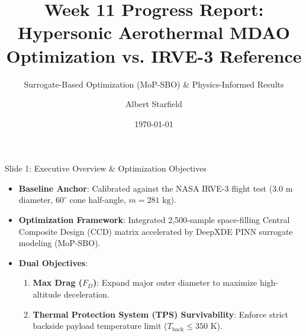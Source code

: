 \documentclass[aspectratio=169,10pt]{beamer}
\title[Week 11 Hypersonic MDAO]{Week 11 Progress Report: Hypersonic Aerothermal MDAO Optimization vs. IRVE-3 Reference}
\subtitle{Surrogate-Based Optimization (MoP-SBO) \& Physics-Informed Results}
\author{Albert Starfield}
\institute{StellarOrion Hypersonic Edition}
\date{\today}
\begin{document}
\begin{frame}
  \titlepage
\end{frame}

\begin{frame}{Slide 1: Executive Overview \& Optimization Objectives}
  \begin{itemize}
    \item \textbf{Baseline Anchor}: Calibrated against the NASA IRVE-3 flight test ($3.0\text{ m}$ diameter, $60^\circ$ cone half-angle, $m=281\text{ kg}$).
    \item \textbf{Optimization Framework}: Integrated 2,500-sample space-filling Central Composite Design (CCD) matrix accelerated by DeepXDE PINN surrogate modeling (MoP-SBO).
    \item \textbf{Dual Objectives}:
      \begin{enumerate}
        \item \textbf{Max Drag ($F_D$)}: Expand major outer diameter to maximize high-altitude deceleration.
        \item \textbf{Thermal Protection System (TPS) Survivability}: Enforce strict backside payload temperature limit ($T_{\text{back}} \le 350\text{ K}$).
      \end{enumerate}
  \end{itemize}
\end{frame}
\end{document}
